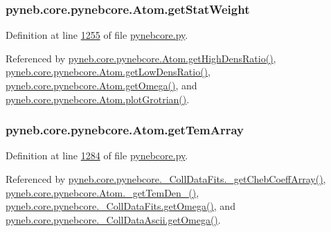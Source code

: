 \hypertarget{classpyneb_1_1core_1_1pynebcore_1_1_atom_a0f2483487115f19556586b9e422bd5fb}{
\subsubsection[{get\-Stat\-Weight}]{\setlength{\rightskip}{0pt plus 5cm}pyneb.\-core.\-pynebcore.\-Atom.\-get\-Stat\-Weight}}\label{classpyneb_1_1core_1_1pynebcore_1_1_atom_a0f2483487115f19556586b9e422bd5fb}


Definition at line \hyperlink{pynebcore_8py_source_l01255}{1255} of file \hyperlink{pynebcore_8py_source}{pynebcore.\-py}.



Referenced by \hyperlink{pynebcore_8py_source_l01719}{pyneb.\-core.\-pynebcore.\-Atom.\-get\-High\-Dens\-Ratio()}, \hyperlink{pynebcore_8py_source_l01698}{pyneb.\-core.\-pynebcore.\-Atom.\-get\-Low\-Dens\-Ratio()}, \hyperlink{pynebcore_8py_source_l01324}{pyneb.\-core.\-pynebcore.\-Atom.\-get\-Omega()}, and \hyperlink{pynebcore_8py_source_l02443}{pyneb.\-core.\-pynebcore.\-Atom.\-plot\-Grotrian()}.

\hypertarget{classpyneb_1_1core_1_1pynebcore_1_1_atom_a764cc048a87d3d89204a616774bdaac6}{
\subsubsection[{get\-Tem\-Array}]{\setlength{\rightskip}{0pt plus 5cm}pyneb.\-core.\-pynebcore.\-Atom.\-get\-Tem\-Array}}\label{classpyneb_1_1core_1_1pynebcore_1_1_atom_a764cc048a87d3d89204a616774bdaac6}


Definition at line \hyperlink{pynebcore_8py_source_l01284}{1284} of file \hyperlink{pynebcore_8py_source}{pynebcore.\-py}.



Referenced by \hyperlink{pynebcore_8py_source_l00751}{pyneb.\-core.\-pynebcore.\-\_\-\-Coll\-Data\-Fits.\-\_\-get\-Cheb\-Coeff\-Array()}, \hyperlink{pynebcore_8py_source_l01869}{pyneb.\-core.\-pynebcore.\-Atom.\-\_\-get\-Tem\-Den\-\_()}, \hyperlink{pynebcore_8py_source_l00828}{pyneb.\-core.\-pynebcore.\-\_\-\-Coll\-Data\-Fits.\-get\-Omega()}, and \hyperlink{pynebcore_8py_source_l01082}{pyneb.\-core.\-pynebcore.\-\_\-\-Coll\-Data\-Ascii.\-get\-Omega()}.

